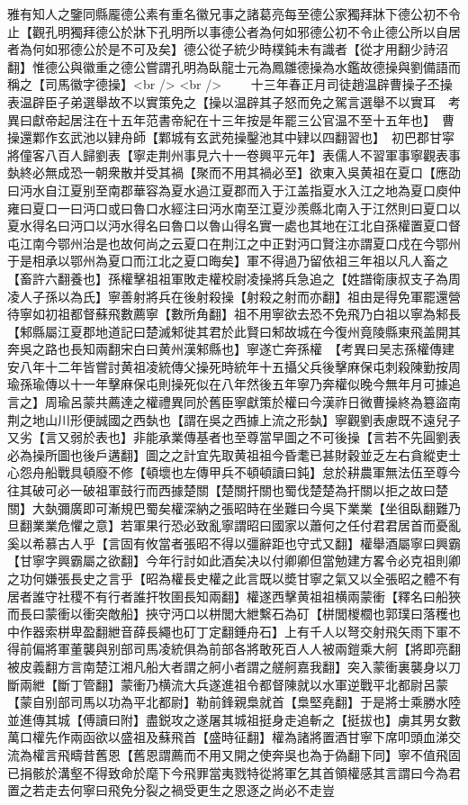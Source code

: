 雅有知人之鑒同縣龎德公素有重名徽兄事之諸葛亮每至德公家獨拜牀下德公初不令止【觀孔明獨拜德公於牀下孔明所以事德公者為何如邪德公初不令止德公所以自居者為何如邪德公於是不可及矣】德公從子統少時樸鈍未有識者【從才用翻少詩沼翻】惟德公與徽重之德公嘗謂孔明為臥龍士元為鳳雛德操為水鑑故德操與劉備語而稱之【司馬徽字德操】<br />
<br />
　　十三年春正月司徒趙温辟曹操子丕操表温辟臣子弟選舉故不以實策免之【操以温辟其子怒而免之駕言選舉不以實耳　考異曰獻帝起居注在十五年范書帝紀在十三年按是年罷三公官温不至十五年也】　曹操還鄴作玄武池以肄舟師【鄴城有玄武苑操鑿池其中肄以四翻習也】　初巴郡甘寜將僮客八百人歸劉表【寧走荆州事見六十一卷興平元年】表儒人不習軍事寧觀表事埶終必無成恐一朝衆散并受其禍【聚而不用其禍必至】欲東入吳黄祖在夏口【應劭曰沔水自江夏别至南郡華容為夏水過江夏郡而入于江盖指夏水入江之地為夏口庾仲雍曰夏口一曰沔口或曰魯口水經注曰沔水南至江夏沙羨縣北南入于江然則曰夏口以夏水得名曰沔口以沔水得名曰魯口以魯山得名實一處也其地在江北自孫權置夏口督屯江南今鄂州治是也故何尚之云夏口在荆江之中正對沔口賢注亦謂夏口戍在今鄂州于是相承以鄂州為夏口而江北之夏口晦矣】軍不得過乃留依祖三年祖以凡人畜之【畜許六翻養也】孫權擊祖祖軍敗走權校尉凌操將兵急追之【姓譜衛康叔支子為周凌人子孫以為氏】寧善射將兵在後射殺操【射殺之射而亦翻】祖由是得免軍罷還營待寧如初祖都督蘇飛數薦寧【數所角翻】祖不用寧欲去恐不免飛乃白祖以寧為邾長【邾縣屬江夏郡地道記曰楚滅邾徙其君於此賢曰邾故城在今復州竟陵縣東飛盖開其奔吳之路也長知兩翻宋白曰黄州漢邾縣也】寧遂亡奔孫權　【考異曰吴志孫權傳建安八年十二年皆嘗討黄祖凌統傳父操死時統年十五攝父兵後擊麻保屯刺殺陳勤按周瑜孫瑜傳以十一年擊麻保屯則操死似在八年然後五年寧乃奔權似晚今無年月可據追言之】周瑜呂蒙共薦達之權禮異同於舊臣寧獻策於權曰今漢祚日微曹操終為簒盜南荆之地山川形便誠國之西埶也【謂在吳之西據上流之形埶】寧觀劉表慮既不遠兒子又劣【言又弱於表也】非能承業傳基者也至尊當早圖之不可後操【言若不先圓劉表必為操所圖也後戶遘翻】圖之之計宜先取黄祖祖今昏耄已甚財穀並乏左右貪縱吏士心怨舟船戰具頓廢不修【頓壞也左傳甲兵不頓頓讀曰鈍】怠於耕農軍無法伍至尊今往其破可必一破祖軍鼓行而西據楚關【楚關扞關也蜀伐楚楚為扞關以拒之故曰楚關】大埶彌廣即可漸規巴蜀矣權深納之張昭時在坐難曰今吳下業業【坐徂臥翻難乃旦翻業業危懼之意】若軍果行恐必致亂寧謂昭曰國家以蕭何之任付君君居首而憂亂奚以希慕古人乎【言固有攸當者張昭不得以彊辭距也守式又翻】權舉酒屬寧曰興霸【甘寧字興霸屬之欲翻】今年行討如此酒矣决以付卿卿但當勉建方畧令必克祖則卿之功何嫌張長史之言乎【昭為權長史權之此言既以奬甘寧之氣又以全張昭之體不有居者誰守社稷不有行者誰扞牧圉長知兩翻】權遂西擊黄祖祖横兩蒙衝【釋名曰船狹而長曰蒙衝以衝突敵船】挾守沔口以栟閭大紲繫石為矴【栟閭椶櫚也郭璞曰落穫也中作器索栟卑盈翻紲音薛長繩也矴丁定翻錘舟石】上有千人以弩交射飛矢雨下軍不得前偏將軍董襲與别部司馬凌統俱為前部各將敢死百人人被兩鎧乘大舸【將即亮翻被皮義翻方言南楚江湘凡船大者謂之舸小者謂之艖舸嘉我翻】突入蒙衝裏襲身以刀斷兩紲【斷丁管翻】蒙衝乃横流大兵遂進祖令都督陳就以水軍逆戰平北都尉呂蒙【蒙自别部司馬以功為平北都尉】勒前鋒親梟就首【梟堅堯翻】于是將士乘勝水陸並進傳其城【傅讀曰附】盡鋭攻之遂屠其城祖挺身走追斬之【挺拔也】虜其男女數萬口權先作兩函欲以盛祖及蘇飛首【盛時征翻】權為諸將置酒甘寧下席叩頭血涕交流為權言飛疇昔舊恩【舊恩謂薦而不用又開之使奔吳也為于偽翻下同】寧不值飛固已捐骸於溝壑不得致命於麾下今飛罪當夷戮特從將軍乞其首領權感其言謂曰今為君置之若走去何寧曰飛免分裂之禍受更生之恩逐之尚必不走豈